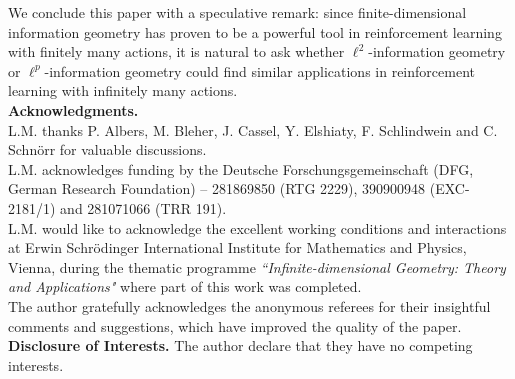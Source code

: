 \documentclass[runningheads]{llncs}
\begin{document}
We conclude this paper with a speculative remark: since finite-dimensional information geometry has proven to be a powerful tool in reinforcement learning with finitely many actions, it is natural to ask whether $\ell^2$-information geometry or $\ell^p$-information geometry could find similar applications in reinforcement learning with infinitely many actions.
\ \\
\noindent
\textbf{Acknowledgments.}\\
L.M. thanks P. Albers, M. Bleher, J. Cassel, Y. Elshiaty, F. Schlindwein and C. Schnörr for valuable discussions.\\
L.M. acknowledges funding by the Deutsche Forschungsgemeinschaft (DFG, German Research Foundation) – 281869850 (RTG 2229), 390900948 (EXC-2181/1) and 281071066 (TRR 191).\\
L.M. would like to acknowledge the excellent working
conditions and interactions at Erwin Schrödinger International
Institute for Mathematics and Physics, Vienna, during the thematic
programme \emph{``Infinite-dimensional Geometry: Theory and Applications"}
where part of this work was completed.\\
The author gratefully acknowledges the anonymous referees for their insightful comments and suggestions, which have improved the quality of the paper.
\noindent \\
\textbf{Disclosure of Interests.}
The author declare that they have no competing interests.
\appendix 
\end{document}
